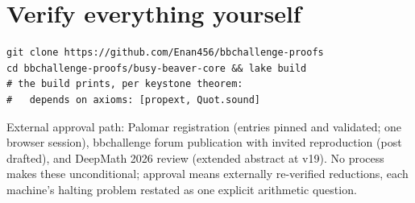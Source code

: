 \documentclass[11pt]{article}
\begin{document}
\section*{Verify everything yourself}

\begin{verbatim}
git clone https://github.com/Enan456/bbchallenge-proofs
cd bbchallenge-proofs/busy-beaver-core && lake build
# the build prints, per keystone theorem:
#   depends on axioms: [propext, Quot.sound]
\end{verbatim}

\noindent External approval path: Palomar registration (entries
pinned and validated; one browser session), bbchallenge forum
publication with invited reproduction (post drafted), and DeepMath
2026 review (extended abstract at v19). No process makes these
unconditional; approval means externally re-verified reductions,
each machine's halting problem restated as one explicit arithmetic
question.
\end{document}
